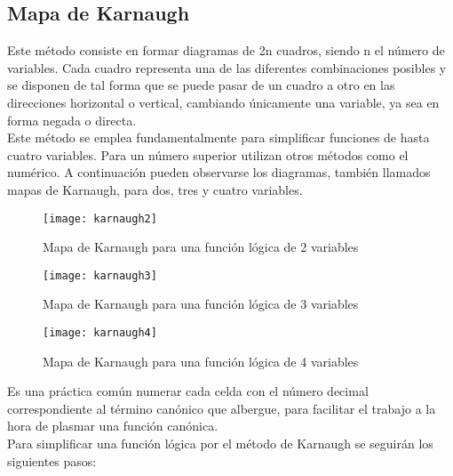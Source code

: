 \documentclass{article}
\begin{document}
            \subsection{Mapa de Karnaugh}
                Este método consiste en formar diagramas de 2n cuadros, siendo n el número de variables. Cada cuadro representa una de las diferentes combinaciones posibles y se disponen de tal forma que se puede pasar de un cuadro a otro en las direcciones horizontal o vertical, cambiando únicamente una variable, ya sea en forma negada o directa.\\
                Este método se emplea fundamentalmente para simplificar funciones de hasta cuatro variables. Para un número superior utilizan otros métodos como el numérico. A continuación pueden observarse los diagramas, también llamados mapas de Karnaugh, para dos, tres y cuatro variables.\\
                \begin{figure}[htp]
                \centering
                \texttt{[image: karnaugh2]}
                \caption{Mapa de Karnaugh para una función lógica de 2 variables}
                \end{figure}
                \begin{figure}[htp]
                \centering
                \texttt{[image: karnaugh3]}
                \caption{Mapa de Karnaugh para una función lógica de 3 variables}
                \end{figure}
                \begin{figure}[htp]
                \centering
                \texttt{[image: karnaugh4]}
                \caption{Mapa de Karnaugh para una función lógica de 4 variables}
                \end{figure}
                Es una práctica común numerar cada celda con el número decimal correspondiente al término canónico que albergue, para facilitar el trabajo a la hora de plasmar una función canónica.\\
                Para simplificar una función lógica por el método de Karnaugh se seguirán los siguientes pasos:\\
\end{document}
